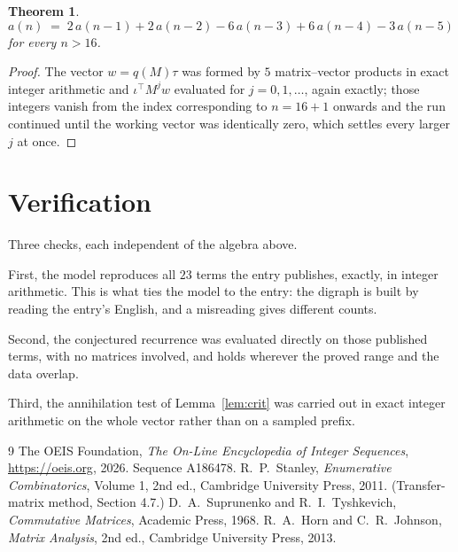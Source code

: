 \documentclass[11pt,a4paper]{article}
\theoremstyle{plain}
\newtheorem{theorem}{Theorem}
\theoremstyle{definition}
\begin{document}
\begin{theorem}
\[
a(n)\;=\;2\,a(n-1) + 2\,a(n-2) - 6\,a(n-3) + 6\,a(n-4) - 3\,a(n-5)
\]
for every $n>16$.
\end{theorem}

\begin{proof}
The vector $w=q(M)\tau$ was formed by $5$ matrix--vector products in exact integer
arithmetic and $\iota^{\!\top}M^{j}w$ evaluated for $j=0,1,\dots$, again exactly; those
integers vanish from the index corresponding to $n=16+1$ onwards and the run continued
until the working vector was identically zero, which settles every larger $j$ at once.
\end{proof}

\section{Verification}

Three checks, each independent of the algebra above.

First, the model reproduces all $23$ terms the entry publishes, exactly, in integer
arithmetic. This is what ties the model to the entry: the digraph is built by reading the
entry's English, and a misreading gives different counts.

Second, the conjectured recurrence was evaluated directly on those published terms, with no
matrices involved, and holds wherever the proved range and the data overlap.

Third, the annihilation test of Lemma~\ref{lem:crit} was carried out in exact integer
arithmetic on the whole vector rather than on a sampled prefix.

\begin{thebibliography}{9}
 The OEIS Foundation, \emph{The On-Line Encyclopedia of Integer
Sequences}, \url{https://oeis.org}, 2026. Sequence A186478.
 R.~P.~Stanley, \emph{Enumerative Combinatorics}, Volume 1, 2nd ed.,
Cambridge University Press, 2011. (Transfer-matrix method, Section 4.7.)
 D.~A.~Suprunenko and R.~I.~Tyshkevich, \emph{Commutative Matrices},
Academic Press, 1968.
 R.~A.~Horn and C.~R.~Johnson, \emph{Matrix Analysis}, 2nd ed., Cambridge
University Press, 2013.
\end{thebibliography}
\end{document}
